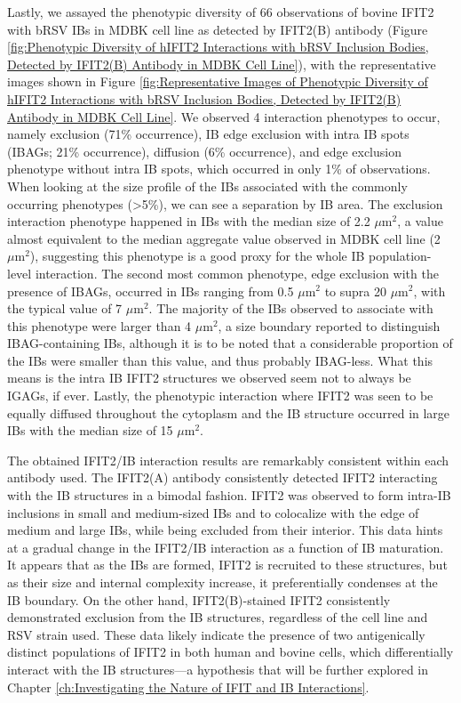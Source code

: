 Lastly, we assayed the phenotypic diversity of 66 observations of bovine IFIT2 with bRSV IBs in MDBK cell line as detected by IFIT2(B) antibody (Figure \ref{fig:Phenotypic Diversity of hIFIT2 Interactions with bRSV Inclusion Bodies, Detected by IFIT2(B) Antibody in MDBK Cell Line}), with the representative images shown in Figure \ref{fig:Representative Images of Phenotypic Diversity of hIFIT2 Interactions with bRSV Inclusion Bodies, Detected by IFIT2(B) Antibody in MDBK Cell Line}. We observed 4 interaction phenotypes to occur, namely exclusion (71\% occurrence), IB edge exclusion with intra IB spots (IBAGs; 21\% occurrence), diffusion (6\% occurrence), and edge exclusion phenotype without intra IB spots, which occurred in only 1\% of observations. When looking at the size profile of the IBs associated with the commonly occurring phenotypes (>5\%), we can see a separation by IB area. The exclusion interaction phenotype happened in IBs with the median size of 2.2 \(\mu \mbox{m}^2\), a value almost equivalent to the median aggregate value observed in MDBK cell line (2 \(\mu \mbox{m}^2\)), suggesting this phenotype is a good proxy for the whole IB population-level interaction. The second most common phenotype, edge exclusion with the presence of IBAGs, occurred in IBs ranging from 0.5 \(\mu \mbox{m}^2\) to supra 20 \(\mu \mbox{m}^2\), with the typical value of 7 \(\mu \mbox{m}^2\). The majority of the IBs observed to associate with this phenotype were larger than 4 \(\mu \mbox{m}^2\), a size boundary reported to distinguish IBAG-containing IBs, although it is to be noted that a considerable proportion of the IBs were smaller than this value, and thus probably IBAG-less. What this means is the intra IB IFIT2 structures we observed seem not to always be IGAGs, if ever. Lastly, the phenotypic interaction where IFIT2 was seen to be equally diffused throughout the cytoplasm and the IB structure occurred in large IBs with the median size of 15 \(\mu \mbox{m}^2\).

The obtained IFIT2/IB interaction results are remarkably consistent within each antibody used. The IFIT2(A) antibody consistently detected IFIT2 interacting with the IB structures in a bimodal fashion. IFIT2 was observed to form intra-IB inclusions in small and medium-sized IBs and to colocalize with the edge of medium and large IBs, while being excluded from their interior. This data hints at a gradual change in the IFIT2/IB interaction as a function of IB maturation. It appears that as the IBs are formed, IFIT2 is recruited to these structures, but as their size and internal complexity increase, it preferentially condenses at the IB boundary. On the other hand, IFIT2(B)-stained IFIT2 consistently demonstrated exclusion from the IB structures, regardless of the cell line and RSV strain used. These data likely indicate the presence of two antigenically distinct populations of IFIT2 in both human and bovine cells, which differentially interact with the IB structures—a hypothesis that will be further explored in Chapter \ref{ch:Investigating the Nature of IFIT and IB Interactions}.

